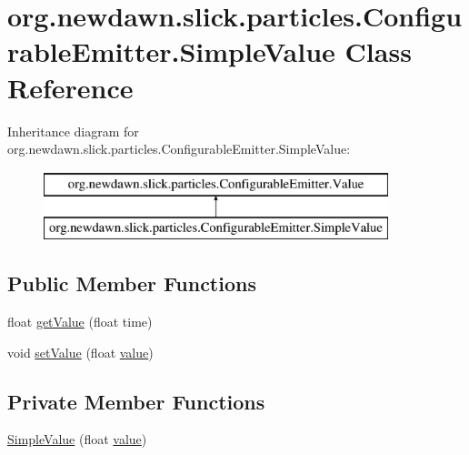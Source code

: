 \hypertarget{classorg_1_1newdawn_1_1slick_1_1particles_1_1_configurable_emitter_1_1_simple_value}{}\section{org.\+newdawn.\+slick.\+particles.\+Configurable\+Emitter.\+Simple\+Value Class Reference}
\label{classorg_1_1newdawn_1_1slick_1_1particles_1_1_configurable_emitter_1_1_simple_value}
Inheritance diagram for org.\+newdawn.\+slick.\+particles.\+Configurable\+Emitter.\+Simple\+Value\+:\begin{figure}[H]
\begin{center}
\leavevmode
\includegraphics[height=2.000000cm]{classorg_1_1newdawn_1_1slick_1_1particles_1_1_configurable_emitter_1_1_simple_value}
\end{center}
\end{figure}
\subsection*{Public Member Functions}
\begin{DoxyCompactItemize}
\item 
float \mbox{\hyperlink{classorg_1_1newdawn_1_1slick_1_1particles_1_1_configurable_emitter_1_1_simple_value_a427ab1df90b809a575492d6e55e7357b}{get\+Value}} (float time)
\item 
void \mbox{\hyperlink{classorg_1_1newdawn_1_1slick_1_1particles_1_1_configurable_emitter_1_1_simple_value_a660fa1466cfb78894f3b3d3dc1ee7767}{set\+Value}} (float \mbox{\hyperlink{classorg_1_1newdawn_1_1slick_1_1particles_1_1_configurable_emitter_1_1_simple_value_a660ac8ed4db304925cecaf64165c1f3e}{value}})
\end{DoxyCompactItemize}
\subsection*{Private Member Functions}
\begin{DoxyCompactItemize}
\item 
\mbox{\hyperlink{classorg_1_1newdawn_1_1slick_1_1particles_1_1_configurable_emitter_1_1_simple_value_a9ba58964298d037d732dab840f730013}{Simple\+Value}} (float \mbox{\hyperlink{classorg_1_1newdawn_1_1slick_1_1particles_1_1_configurable_emitter_1_1_simple_value_a660ac8ed4db304925cecaf64165c1f3e}{value}})
\end{DoxyCompactItemize}
